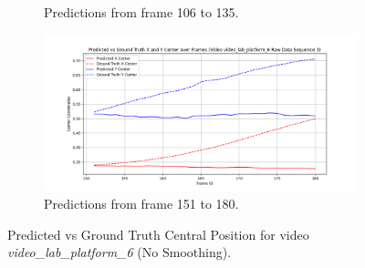 \documentclass[12pt,oneside]{book} %
\begin{document}
\begin{figure}[H]
\begin{subfigure}[t]{0.45\textwidth}
        \caption{Predictions from frame 106 to 135.}
        \label{fig:framework-video_lab_platform_6-2}
    \end{subfigure}
    \hfill
    \begin{subfigure}[t]{0.45\textwidth}
        \includegraphics[width=\textwidth]{figures/framework/video_lab_platform_6 Raw Data - 3.png}
        \caption{Predictions from frame 151 to 180.}
        \label{fig:framework-video_lab_platform_6-3}
    \end{subfigure}
    \caption{Predicted vs Ground Truth Central Position for video \textit{video\_lab\_platform\_6} (No Smoothing). }
    \label{fig:framework-video_lab_platform_6}
\end{figure}
\end{document}
